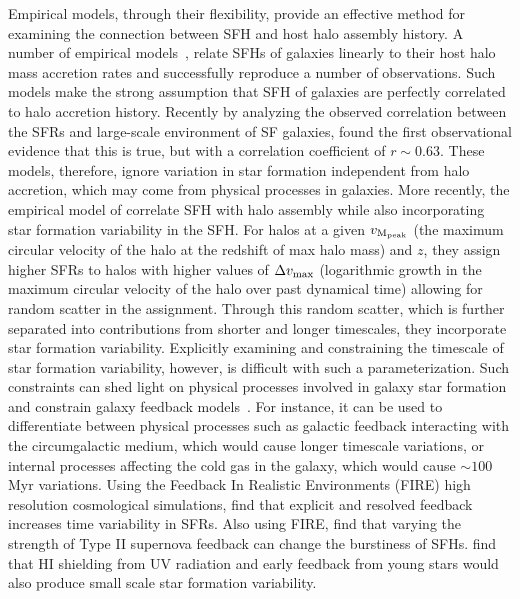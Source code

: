\documentclass[12pt, letterpaper, preprint, tighten]{aastex62}
\begin{document}
Empirical models, through their flexibility, provide an effective 
method for examining the connection between SFH and host halo assembly 
history. A number of empirical models~\citep{taghizadeh-popp2015, becker2015, rodriguez-puebla2016a, mitra2017, cohn2017, moster2017},
relate SFHs of galaxies linearly to their host halo mass accretion
rates and successfully reproduce a number of observations. Such models
make the strong assumption that SFH of galaxies are perfectly 
correlated to halo accretion history. Recently by analyzing the observed 
correlation between the SFRs and large-scale environment of SF galaxies, 
\cite{tinker2018b} found the first observational evidence that this is 
true, but with a correlation coefficient of $r \sim 0.63$.
These models, therefore, ignore variation in star formation independent 
from halo accretion, which may come from physical processes in galaxies. 
More recently, the empirical model of \cite{behroozi2019} correlate SFH
with halo assembly while also incorporating star formation variability in
the SFH. For halos at a given $v_{\rm M_{peak}}$ (the maximum circular
velocity of the halo at the redshift of max halo mass) and $z$, they
assign higher SFRs to halos with higher values of $\Delta v_{\rm max}$
(logarithmic growth in the maximum circular velocity of the halo over past dynamical time)
allowing for random scatter in the assignment. Through this random scatter,
which is further separated into contributions from shorter and longer timescales,
they incorporate star formation variability. Explicitly examining and constraining
the timescale of star formation variability, however, is difficult with such a
parameterization. Such constraints can shed light on physical processes 
involved in galaxy star formation and constrain galaxy feedback 
models~\citep{sparre2015}. For instance, it can be used to differentiate 
between physical processes such as galactic feedback interacting with the 
circumgalactic medium, which would cause longer timescale variations, or 
internal processes affecting the cold gas in the galaxy, which would cause 
$\sim 100$ Myr variations. Using the Feedback In Realistic Environments 
(FIRE) high resolution cosmological simulations, \cite{hopkins2014} find 
that explicit and resolved feedback increases time variability in SFRs.
Also using FIRE, \cite{sparre2017} find that varying the strength of
Type II supernova feedback can change the burstiness of SFHs.
\cite{governato2015} find that HI shielding from UV radiation and
early feedback from young stars would also produce small scale star
formation variability.
\end{document}
